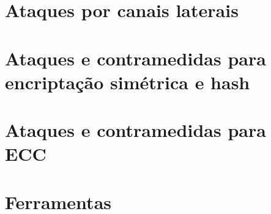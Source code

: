 \documentclass{SBCbookchapter}
\begin{document}
\section{Ataques por canais laterais}


\section{Ataques e contramedidas para encriptação simétrica e hash}


\section{Ataques e contramedidas para ECC}




\section{Ferramentas}











\end{document}
